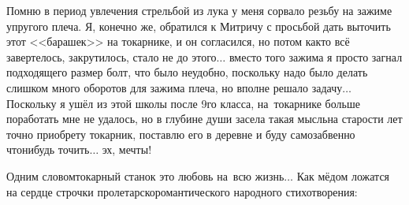 Помню в период увлечения стрельбой из лука у меня сорвало резьбу на зажиме упругого плеча. Я, конечно же, обратился к Митричу с просьбой дать выточить этот <<барашек>> на токарнике, и он согласился, но потом как\sdash то всё завертелось, закрутилось, стало не до этого$\ldots$ вместо того зажима я просто загнал подходящего размер болт, что было неудобно, поскольку надо было делать слишком много оборотов для зажима плеча, но вполне решало задачу$\ldots$ Поскольку я ушёл из этой школы после 9\sdash го класса, на~токарнике больше поработать мне не удалось, но в глубине души засела такая мысль\mdash на старости лет точно приобрету токарник, поставлю его в деревне и буду самозабвенно что\sdash нибудь точить$\ldots$ эх, мечты!

Одним словом\mdash токарный станок это любовь на~всю жизнь$\ldots$ Как мёдом ложатся на сердце строчки пролетарско\sdash романтического народного стихотворения:

